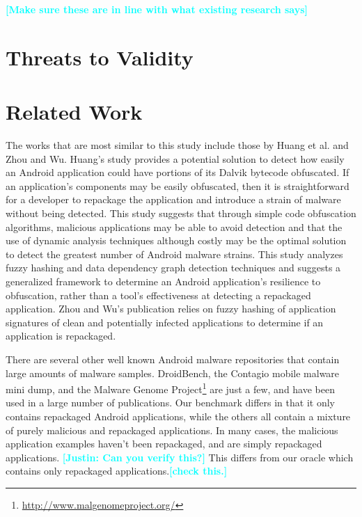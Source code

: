 \documentclass{sig-alternate}
\newcommand{\todo}[1]{\textcolor{cyan}{\textbf{[#1]}}}
\begin{document}
\todo{Make sure these are in line with what existing research says}




\section{Threats to Validity}
\label{sec: threats}





\section{Related Work}
\label{sec: relatedworks}



The works that are most similar to this study include those by Huang et al.\cite{huang2013framework} and Zhou and Wu\cite{zhou2012detecting}. Huang's study provides a potential solution to detect how easily an Android application could have portions of its Dalvik bytecode obfuscated. If an application's components may be easily obfuscated, then it is straightforward for a developer to repackage the application and introduce a strain of malware without being detected. This study suggests that through simple code obfuscation algorithms, malicious applications may be able to avoid detection and that the use of dynamic analysis techniques although costly may be the optimal solution to detect the greatest number of Android malware strains. This study analyzes fuzzy hashing and data dependency graph detection techniques and suggests a generalized framework to determine an Android application's resilience to obfuscation, rather than a tool's effectiveness at detecting a repackaged application. Zhou and Wu's publication relies on fuzzy hashing of application signatures of clean and potentially infected applications to determine if an application is repackaged.

There are several other well known Android malware repositories that contain large amounts of malware samples. DroidBench, the Contagio mobile malware mini dump, and the Malware Genome Project\footnote{\url{http://www.malgenomeproject.org/}} are just a few, and have been used in a large number of publications. Our benchmark differs in that it only contains repackaged Android applications, while the others all contain a mixture of purely malicious and repackaged applications. In many cases, the malicious application examples haven't been repackaged, and are simply repackaged applications. \todo{Justin: Can you verify this?} This differs from our oracle which contains only repackaged applications.\todo{check this.}
\end{document}
